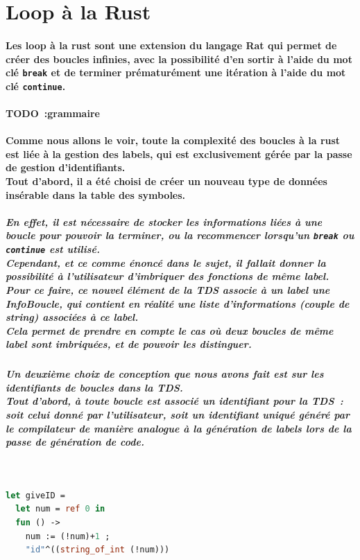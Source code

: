 \documentclass[french]{article}
\begin{document}
\section{Loop à la Rust}

\paragraph*{Les loop à la rust sont une extension du langage Rat qui permet de créer des boucles infinies,
avec la possibilité d'en sortir à l'aide du mot clé \texttt{break} 
et de terminer prématurément une itération à l'aide du mot clé \texttt{continue}.}
\paragraph*{TODO~:\@ grammaire}
\paragraph*{Comme nous allons le voir, toute la complexité des boucles à la rust est liée à la gestion des labels, qui est exclusivement gérée par la passe de gestion d'identifiants.\\
Tout d'abord, il a été choisi de créer un nouveau type de données insérable dans la table des symboles.}
\subparagraph*{En effet, il est nécessaire de stocker les informations liées à une boucle pour pouvoir la terminer, ou la recommencer
lorsqu'un \texttt{break} ou \texttt{continue} est utilisé.\\
Cependant, et ce comme énoncé dans le sujet, il fallait donner la possibilité à l'utilisateur d'imbriquer des fonctions de même label.\\
Pour ce faire, ce nouvel élément de la TDS associe à un label une InfoBoucle, qui contient en réalité une liste d'informations (couple de \emph{string}) associées à ce label.\\
Cela permet de prendre en compte le cas où deux boucles de même label sont imbriquées, et de pouvoir les distinguer. \\} %
\subparagraph*{Un deuxième choix de conception que nous avons fait est sur les identifiants de boucles dans la TDS.\\
Tout d'abord, à toute boucle est associé un identifiant pour la TDS~: soit celui donné par l'utilisateur, soit un identifiant uniqué généré par le compilateur
de manière analogue à la génération de labels lors de la passe de génération de code.}
\,
\begin{lstlisting}[language=Ocaml]
let giveID = 
  let num = ref 0 in
  fun () ->
    num := (!num)+1 ;
    "id"^((string_of_int (!num)))
\end{lstlisting}
\end{document}
